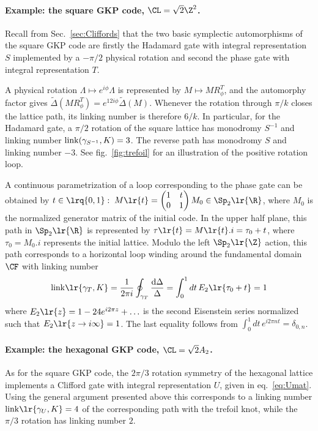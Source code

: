 \documentclass[a4paper, aps, pra, 11pt, onecolumn, tightenlines, superscriptaddress]{revtex4-2}
\begin{document}
\paragraph*{Example: the square GKP code, $\CL=\sqrt{2}\Z^2$.}
Recall from Sec.~\ref{sec:Cliffords} that the two basic symplectic automorphisms of the square GKP code are firstly the Hadamard gate with integral representation $S$ implemented by a $-\pi/2$ physical rotation and second the phase gate with integral representation $T$. 

A physical rotation $\Lambda\mapsto e^{i\phi}\Lambda$ is represented by $M\mapsto MR_\phi^T$, and the automorphy factor gives $\widetilde\Delta(MR_\phi^T)=e^{12i\phi}\widetilde\Delta(M)$. Whenever the rotation through $\pi/k$ closes the lattice path, its linking number is therefore $6/k$. In particular, for the Hadamard gate, a $\pi/2$ rotation of the square lattice has monodromy $S^{-1}$ and linking number ${\rm link}(\gamma_{S^{-1}},K)=3$. The reverse path has monodromy $S$ and linking number $-3$. See fig.~\ref{fig:trefoil} for an illustration of the positive rotation loop.

A continuous parametrization of a loop corresponding to the phase gate can be obtained by $t\in \lrq{0,1}:\;M\lr{t}=\begin{pmatrix}
    1 & t\\ 0 & 1
\end{pmatrix}M_0 \in \Sp_2\lr{\R}$,
where $M_0$ is the normalized generator matrix of the initial code. In the upper half plane, this path in $\Sp_2\lr{\R}$ is represented by $\tau\lr{t}=M\lr{t}.i=\tau_0+t$, where $\tau_0=M_0.i$ represents the initial lattice. Modulo the left $\Sp_2\lr{\Z}$ action, this path corresponds to a horizontal loop winding around the fundamental domain $\CF$ with linking number
\begin{equation}
    {\rm link}\lr{\gamma_T, K}=\frac{1}{2\pi i}\oint_{\gamma_T} \frac{\mathrm{d}\Delta}{\Delta}=\int_0^1 dt\, E_2\lr{\tau_0+t}=1
\end{equation}
where $E_2\lr{z}=1-24e^{i2\pi z} + \hdots$ is the second Eisenstein series normalized such that $E_2\lr{z \rightarrow i\infty} = 1$. The last equality follows from $\int_0^1 dt\, e^{i2\pi n t} =\delta_{0,n}$.
\medskip

\paragraph*{Example: the hexagonal GKP code, $\CL=\sqrt{2}A_2$.}
As for the square GKP code, the $2\pi/3$ rotation symmetry of the hexagonal lattice implements a Clifford gate with integral representation $U$, given in eq.~\eqref{eq:Umat}. Using the general argument presented above this corresponds to a linking number ${\rm link}\lr{\gamma_U,  K}=4$ of the corresponding path with the trefoil knot, while the $\pi/3$ rotation has linking number $2$.
\medskip
\end{document}
